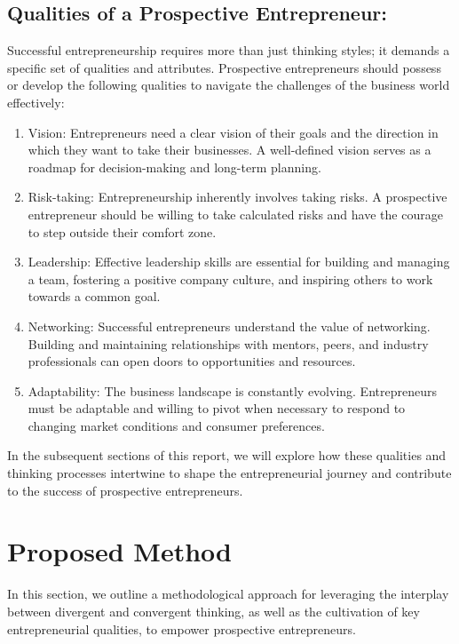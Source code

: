 \documentclass[12pt]{report}
\begin{document}
\subsection*{Qualities of a Prospective Entrepreneur:} Successful entrepreneurship requires more than just thinking styles; it demands a specific set of qualities and attributes. Prospective entrepreneurs should possess or develop the following qualities to navigate the challenges of the business world effectively:
\begin{enumerate}
    \item Vision: Entrepreneurs need a clear vision of their goals and the direction in which they want to take their businesses. A well-defined vision serves as a roadmap for decision-making and long-term planning.
    \item Risk-taking: Entrepreneurship inherently involves taking risks. A prospective entrepreneur should be willing to take calculated risks and have the courage to step outside their comfort zone.
    \item Leadership: Effective leadership skills are essential for building and managing a team, fostering a positive company culture, and inspiring others to work towards a common goal.
    \item Networking: Successful entrepreneurs understand the value of networking. Building and maintaining relationships with mentors, peers, and industry professionals can open doors to opportunities and resources.
    \item Adaptability: The business landscape is constantly evolving. Entrepreneurs must be adaptable and willing to pivot when necessary to respond to changing market conditions and consumer preferences.
\end{enumerate}
In the subsequent sections of this report, we will explore how these qualities and thinking
processes intertwine to shape the entrepreneurial journey and contribute to the success of
prospective entrepreneurs.





\newpage
\section*{Proposed Method}
In this section, we outline a methodological approach for leveraging the interplay between
divergent and convergent thinking, as well as the cultivation of key entrepreneurial qualities,
to empower prospective entrepreneurs.\cite{theory}
\end{document}
